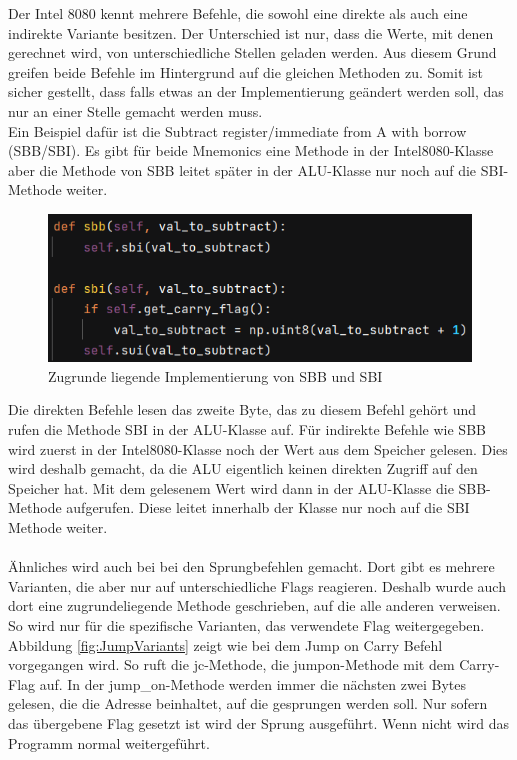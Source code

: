 \documentclass[12pt]{article}
\newcommand{\imgSpaceBefore}{\vspace{10pt}}
\begin{document}
Der Intel 8080 kennt mehrere Befehle, die sowohl eine direkte als auch eine indirekte Variante besitzen. Der Unterschied ist nur, dass die Werte, mit denen gerechnet wird, von unterschiedliche Stellen geladen werden. Aus diesem Grund greifen beide Befehle im Hintergrund auf die gleichen Methoden zu. Somit ist sicher gestellt, dass falls etwas an der Implementierung geändert werden soll, das nur an einer Stelle gemacht werden muss.
\\
Ein Beispiel dafür ist die \glqq Subtract register/immediate from A with borrow (SBB/SBI)\grqq. Es gibt für beide Mnemonics eine Methode in der Intel8080-Klasse aber die Methode von SBB leitet später in der ALU-Klasse nur noch auf die SBI-Methode weiter.

\imgSpaceBefore
\begin{figure}[h]
\centering
\includegraphics[width=15cm]{Bilder/DoubleUsedMethodSubtract}
\caption{Zugrunde liegende Implementierung von SBB und SBI}
\label{fig:DoubleUsedMethodSubtract}
\end{figure}

\noindent
Die direkten Befehle lesen das zweite Byte, das zu diesem Befehl gehört und rufen die
Methode SBI in der ALU-Klasse auf. Für indirekte Befehle wie SBB wird zuerst in der Intel8080-Klasse noch der Wert aus dem Speicher gelesen. Dies wird deshalb gemacht, da die ALU eigentlich keinen direkten Zugriff auf den Speicher hat. Mit dem gelesenem Wert wird dann in der ALU-Klasse die SBB-Methode aufgerufen. Diese leitet innerhalb der Klasse nur noch auf die SBI Methode weiter.
\\\\
Ähnliches wird auch bei bei den Sprungbefehlen gemacht. Dort gibt es mehrere Varianten, die aber nur auf unterschiedliche Flags reagieren. Deshalb wurde auch dort eine zugrundeliegende Methode geschrieben, auf die alle anderen verweisen. So wird nur für die spezifische Varianten, das verwendete Flag weitergegeben.  Abbildung \ref{fig:JumpVariants} zeigt wie bei dem Jump on Carry Befehl vorgegangen wird. So ruft die jc-Methode, die jump\-on-Methode mit dem Carry-Flag auf. In der jump\_on-Methode werden immer die nächsten zwei Bytes gelesen, die die Adresse beinhaltet, auf die gesprungen werden soll. Nur sofern das übergebene Flag gesetzt ist wird der Sprung ausgeführt. Wenn nicht wird das Programm normal weitergeführt.
\end{document}
